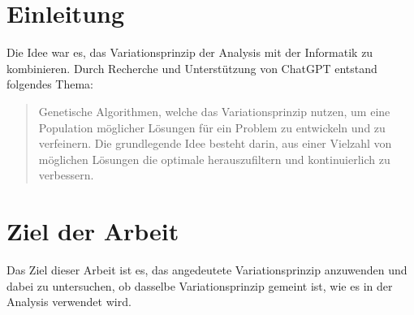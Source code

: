 %
%
%
%
\section{Einleitung
\label{buch:paper:section:introduction}}
Die Idee war es, das Variationsprinzip der Analysis mit der Informatik zu kombinieren. 
%
Durch Recherche und Unterstützung von ChatGPT entstand folgendes Thema:

\begin{quote}
    Genetische Algorithmen, welche das Variationsprinzip nutzen, um eine Population 
%
    möglicher Lösungen für ein Problem zu entwickeln und zu verfeinern. 
    Die grundlegende Idee besteht darin, aus einer Vielzahl von möglichen Lösungen 
    die optimale herauszufiltern und kontinuierlich zu verbessern.
\end{quote}

\section{Ziel der Arbeit
\label{buch:paper:varalg:section:goal}} 
Das Ziel dieser Arbeit ist es, das angedeutete Variationsprinzip anzuwenden und dabei 
zu untersuchen, ob dasselbe Variationsprinzip gemeint ist, wie es in der Analysis 
verwendet wird.
